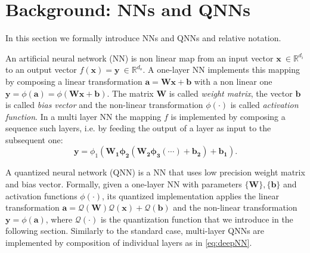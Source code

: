 \section{Background: NNs and QNNs}\label{sec:background}

In this section we formally introduce NNs and QNNs and relative notation.

An artificial neural network (NN) is non linear map from an input vector $\mathbf{x} \ \in \mathbb{R}^{d_i}$ to an output vector $f(\mathbf{x} ) = \mathbf{y} \ \in \mathbb{R}^{d_o}$. A one-layer NN implements this mapping by composing a linear transformation $ \mathbf{a} = \mathbf{W}\mathbf{x} + \mathbf{b}$ with a non linear one $\mathbf{y} = \phi(\mathbf{a})=\phi(\mathbf{W}\mathbf{x} + \mathbf{b})$.  The matrix $\mathbf{W}$ is called \emph{weight matrix}, the vector $\mathbf{b}$ is called \emph{bias vector} and the non-linear transformation $\phi(\cdot)$ is called \emph{activation function}. In a multi layer NN the mapping $f$ is implemented by composing a sequence such layers, i.e. by feeding the output of a layer as input to the subsequent one:
\begin{equation}\label{eq:deepNN}
\mathbf{y} =\phi_1(\mathbf{W_1}\mathbf{\phi_2(\mathbf{W_2}\phi_3(\mathbf{\cdots}) + \mathbf{b_2})} + \mathbf{b_1}).
\end{equation}

A quantized neural network (QNN) is a NN that uses low precision weight matrix and bias vector. Formally, given a one-layer NN with parameters $\{\mathbf{W}\}, \{\mathbf{b}\}$ and activation functions $\phi(\cdot)$, its quantized implementation applies  the linear transformation $\mathbf{a} = \mathcal{Q}(\mathbf{W}) \mathcal{Q}(\mathbf{x}) + \mathcal{Q}(\mathbf{b})$ and the non-linear transformation $\mathbf{y} = \phi(\mathbf{a})$, where $\mathcal{Q}(\cdot)$ is the quantization function that we introduce in the following section. Similarly to the standard case, multi-layer QNNs are implemented by composition of individual layers as in \cref{eq:deepNN}.

